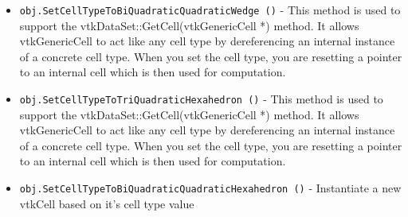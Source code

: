 \begin{itemize}
\item  \verb|obj.SetCellTypeToBiQuadraticQuadraticWedge ()| -  This method is used to support the vtkDataSet::GetCell(vtkGenericCell *)
 method. It allows vtkGenericCell to act like any cell type by
 dereferencing an internal instance of a concrete cell type. When
 you set the cell type, you are resetting a pointer to an internal
 cell which is then used for computation.

\item  \verb|obj.SetCellTypeToTriQuadraticHexahedron ()| -  This method is used to support the vtkDataSet::GetCell(vtkGenericCell *)
 method. It allows vtkGenericCell to act like any cell type by
 dereferencing an internal instance of a concrete cell type. When
 you set the cell type, you are resetting a pointer to an internal
 cell which is then used for computation.

\item  \verb|obj.SetCellTypeToBiQuadraticQuadraticHexahedron ()| -  Instantiate a new vtkCell based on it's cell type value

\end{itemize}
